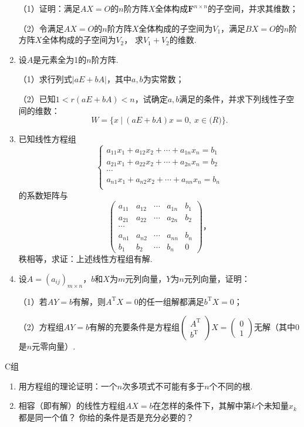 \begin{enumerate}
	（1）证明：满足$AX=O$的$n$阶方阵$X$全体构成$\mathbf{F}^{n\times n}$的子空间，并求其维数；

	（2）令满足$AX=O$的$n$阶方阵$X$全体构成的子空间为$V_1$，满足$BX=O$的$n$阶方阵$X$全体构成的子空间为$V_2$，
	求$V_1+V_2$的维数.

	\item 设$A$是元素全为1的$n$阶方阵.
	
	（1）求行列式$|aE+bA|$，其中$a,b$为实常数；

	（2）已知$1<r(aE+bA)<n$，试确定$a,b$满足的条件，并求下列线性子空间的维数：
	$$W=\{x\ |\ (aE+bA)x=0,\ x\in\mathbf(R)\}.$$
	\item 已知线性方程组$$\begin{cases}
		a_{11}x_1+a_{12}x_2+\cdots+a_{1n}x_n=b_1 \\
		a_{21}x_1+a_{22}x_2+\cdots+a_{2n}x_n=b_2 \\
		\cdots \\
		a_{n1}x_1+a_{n2}x_2+\cdots+a_{nn}x_n=b_n \\
	\end{cases}$$
	的系数矩阵与
	$$\begin{pmatrix}
		a_{11} & a_{12} & \cdots & a_{1n} & b_1 \\
		a_{21} & a_{22} & \cdots & a_{2n} & b_2 \\
		\cdots \\
		a_{n1} & a_{n2} & \cdots & a_{nn} & b_n \\
		b_1 & b_2 & \cdots & b_n & 0
	\end{pmatrix}，$$
	秩相等，求证：上述线性方程组有解.
	\item 设$A=(a_{ij})_{m\times n}$，$b$和$X$为$m$元列向量，$Y$为$n$元列向量，证明：
	
	（1）若$AY=b$有解，则$A^\mathrm{T}X=0$的任一组解都满足$b^\mathrm{T}X=0$；

	（2）方程组$AY=b$有解的充要条件是方程组$\begin{pmatrix}
		A^\mathrm{T} \\ b^\mathrm{T}
	\end{pmatrix}X=\begin{pmatrix}
		0 \\ 1
	\end{pmatrix}$无解（其中0是$n$元零向量）.
\end{enumerate}

\centerline{\heiti C组}
\begin{enumerate}
	\item 用方程组的理论证明：一个$n$次多项式不可能有多于$n$个不同的根.
	\item 相容（即有解）的线性方程组$AX=b$在怎样的条件下，其解中第$k$个未知量$x_k$都是同一个值？
	你给的条件是否是充分必要的？
\end{enumerate}

